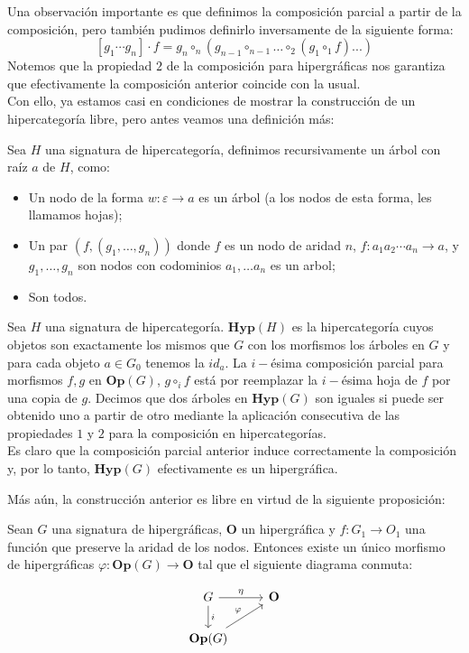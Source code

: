 \documentclass[../main.tex]{subfiles}
\begin{document}
Una observación importante es que definimos la composición parcial a partir de la composición, pero también pudimos definirlo inversamente de la siguiente forma: 
\[
	[g_1\cdots g_n] \cdot f = g_{n}\circ_{n}(g_{n-1}\circ_{n-1}\dots \circ _2(g_1 \circ_1 f)...)
\]
Notemos que la propiedad $2$ de la composición para hipergráficas nos garantiza que efectivamente la composición anterior coincide con la usual. \\
Con ello, ya estamos casi en condiciones de mostrar la construcción de un hipercategoría libre, pero antes veamos una definición más:


\begin{dfn}
	Sea $H$ una signatura de hipercategoría, definimos recursivamente un árbol con raíz $a$ de $H$, como:
	\begin{itemize}
		\item Un nodo de la forma $w: \varepsilon \to a$ es un árbol (a los nodos de esta forma, les llamamos hojas);
		\item Un par $(f, (g_1, \dots , g_n))$ donde $f$ es un nodo de aridad $n$, $f:a_1a_2 \cdots a_n \to a$, y $g_1, \dots , g_n$ son nodos con codominios $a_1, \dots a_n$  es un arbol;
		\item Son todos.  
	\end{itemize}
\end{dfn}

Sea $H$ una signatura de hipercategoría. $\textbf{Hyp}(H)$ es la hipercategoría cuyos objetos son exactamente los mismos que $G$ con los morfismos los árboles en $G$ y para cada objeto $a \in G_0$ tenemos la $id_a$. La $i-$ésima composición parcial para morfismos $f, g$ en $\textbf{Op}(G)$, $g \circ_i f$ está por reemplazar la $i-$ésima hoja de $f$ por una copia de $g$.  Decimos que dos árboles en $\textbf{Hyp}(G)$ son iguales si puede ser obtenido uno a partir de otro mediante la aplicación consecutiva de las propiedades $1$ y $2$ para la composición en hipercategorías. \\
Es claro que la composición parcial anterior induce correctamente la composición y, por lo tanto, $\textbf{Hyp}(G)$ efectivamente es un hipergráfica. 

Más aún, la construcción anterior es libre en virtud de la siguiente proposición: 

\begin{prop}
	Sean $G$ una signatura de hipergráficas, $\textbf{O}$ un hipergráfica y $f:G_1 \to O_1$ una función que preserve la aridad de los nodos. Entonces existe un único morfismo de hipergráficas $\varphi : \textbf{Op}(G) \to \textbf{O}$ tal que el siguiente diagrama conmuta: 
	
	\[
	\begin{tikzcd}
		G \arrow{r}{\eta} \arrow{d}{i} & \textbf{O} \\
		\textbf{Op}(G) \arrow{ur}{\varphi}
	\end{tikzcd}
	\] 
\end{prop} 
\end{document}

